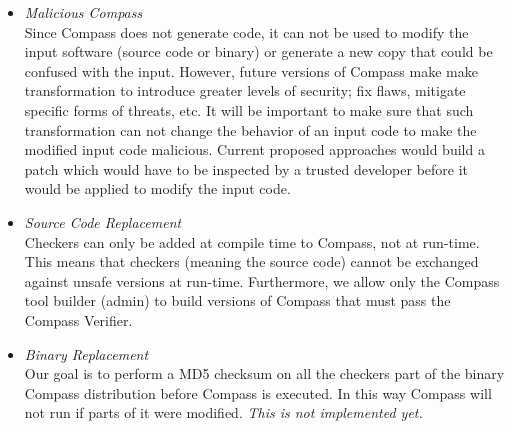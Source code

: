 \begin{itemize}
\item \emph{Malicious Compass} \\
    Since Compass does not generate code, it can not be used to modify the input software
    (source code or binary) or generate a new copy that could be confused with the input.
    However, future versions of Compass make make transformation to introduce greater
    levels of security; fix flaws, mitigate specific forms of threats, etc.  It will be
    important to make sure that such transformation can not change the behavior of an
    input code to make the modified input code malicious.  Current proposed approaches
    would build a patch which would have to be inspected by a trusted developer before
    it would be applied to modify the input code.

\item \emph{Source Code Replacement} \\ Checkers can only be added at compile time to
    Compass, not at run-time. This means that checkers (meaning the source code) cannot be
    exchanged against unsafe versions at run-time. Furthermore, we allow only the Compass
    tool builder (admin) to build versions of Compass that must pass the Compass Verifier.

\item \emph{Binary Replacement} \\ Our goal is to perform a MD5 checksum on all the checkers
    part of the binary Compass distribution before Compass is executed. In this way
    Compass will not run if parts of it were modified. {\em This is not implemented yet.}

\end{itemize} 




